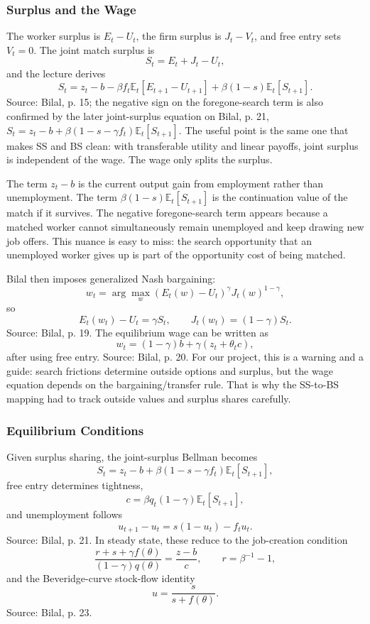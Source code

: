 ﻿\documentclass[11pt]{article}
\newcommand{\E}{\mathbb{E}}
\newcommand{\1}{\mathbf{1}}
\begin{document}
\subsubsection{Surplus and the Wage}

The worker surplus is $E_t-U_t$, the firm surplus is $J_t-V_t$, and free entry
sets $V_t=0$. The joint match surplus is
\[
S_t=E_t+J_t-U_t,
\]
and the lecture derives
\[
S_t
=
z_t-b-\beta f_t\E_t[E_{t+1}-U_{t+1}]
+\beta(1-s)\E_t[S_{t+1}].
\]
Source: Bilal, p. 15; the negative sign on the foregone-search term is also
confirmed by the later joint-surplus equation on Bilal, p. 21,
$S_t=z_t-b+\beta(1-s-\gamma f_t)\E_t[S_{t+1}]$. The useful point is the same
one that makes SS and BS clean: with transferable utility and linear payoffs,
joint surplus is independent of the wage. The wage only splits the surplus.

The term $z_t-b$ is the current output gain from employment rather than
unemployment. The term $\beta(1-s)\E_t[S_{t+1}]$ is the continuation value of
the match if it survives. The negative foregone-search term appears because a
matched worker cannot simultaneously remain unemployed and keep drawing new job
offers. This nuance is easy to miss: the search opportunity that an unemployed
worker gives up is part of the opportunity cost of being matched.

Bilal then imposes generalized Nash bargaining:
\[
w_t=\arg\max_w (E_t(w)-U_t)^\gamma J_t(w)^{1-\gamma},
\]
so
\[
E_t(w_t)-U_t=\gamma S_t,
\qquad
J_t(w_t)=(1-\gamma)S_t.
\]
Source: Bilal, p. 19. The equilibrium wage can be written as
\[
w_t=(1-\gamma)b+\gamma(z_t+\theta_t c),
\]
after using free entry. Source: Bilal, p. 20. For our project, this is a
warning and a guide: search frictions determine outside options and surplus,
but the wage equation depends on the bargaining/transfer rule. That is why the
SS-to-BS mapping had to track outside values and surplus shares carefully.

\subsubsection{Equilibrium Conditions}

Given surplus sharing, the joint-surplus Bellman becomes
\[
S_t=z_t-b+\beta(1-s-\gamma f_t)\E_t[S_{t+1}],
\]
free entry determines tightness,
\[
c=\beta q_t(1-\gamma)\E_t[S_{t+1}],
\]
and unemployment follows
\[
u_{t+1}-u_t=s(1-u_t)-f_tu_t.
\]
Source: Bilal, p. 21. In steady state, these reduce to the job-creation condition
\[
\frac{r+s+\gamma f(\theta)}{(1-\gamma)q(\theta)}
=
\frac{z-b}{c},
\qquad r=\beta^{-1}-1,
\]
and the Beveridge-curve stock-flow identity
\[
u=\frac{s}{s+f(\theta)}.
\]
Source: Bilal, p. 23.
\end{document}
